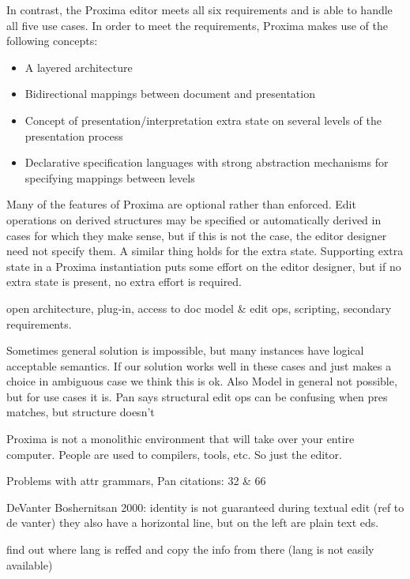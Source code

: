 In contrast, the Proxima editor meets all six requirements and is able to handle all five use cases. In order to meet the requirements, Proxima makes use of the following concepts:

\begin{itemize}
\item A layered architecture
\item Bidirectional mappings between document and presentation
\item Concept of presentation/interpretation extra state on several levels of the presentation process
\item Declarative specification languages with strong abstraction mechanisms for specifying mappings between levels
\end{itemize}

Many of the features of Proxima are optional rather than enforced. Edit operations on derived structures may be specified or automatically derived in cases for which they make sense, but if this is not the case, the editor designer need not specify them. A similar thing holds for the extra state. Supporting extra state in a Proxima instantiation puts some effort on the editor designer, but if no extra state is present, no extra effort is required.



\bc

 open architecture, plug-in, access to doc model & edit ops, scripting, secondary requirements.

Sometimes general solution is impossible, but many instances have logical acceptable semantics. If our solution works well in these cases and just makes a choice in ambiguous case we think this is ok. Also Model in general not possible, but for use cases it is. Pan says structural edit ops can be confusing when pres matches, but structure doesn't

Proxima is not a monolithic environment that will take over your entire computer. People are used to compilers, tools, etc. So just the editor. 


Problems with attr grammars, Pan citations: 32 \& 66


DeVanter Boshernitsan 2000: identity is not guaranteed during textual edit (ref to de vanter)
they also have a horizontal line, but on the left are plain text eds.




find out where lang is reffed and copy the info from there (lang is not easily available)

